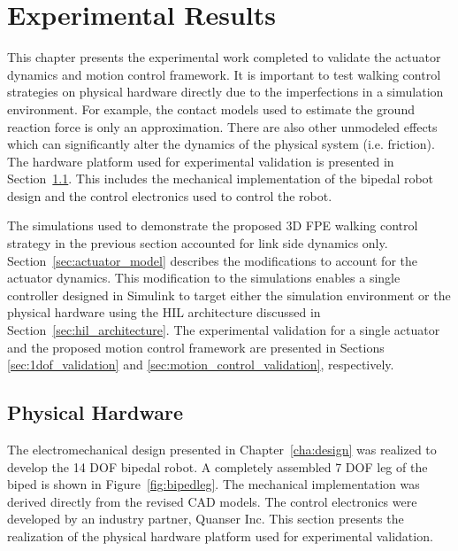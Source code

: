 \chapter{Experimental Results} %
\label{cha:experiments}

This chapter presents the experimental work completed to validate the actuator dynamics and motion control framework. It is important to test walking control strategies on physical hardware directly due to the imperfections in a simulation environment. For example, the contact models used to estimate the ground reaction force is only an approximation. There are also other unmodeled effects which can significantly alter the dynamics of the physical system (i.e. friction). The hardware platform used for experimental validation is presented in Section~\ref{sec:physical_hardware}. This includes the mechanical implementation of the bipedal robot design and the control electronics used to control the robot. 

The simulations used to demonstrate the proposed 3D FPE walking control strategy in the previous section accounted for link side dynamics only. Section~\ref{sec:actuator_model} describes the modifications to account for the actuator dynamics. This modification to the simulations enables a single controller designed in Simulink to target either the simulation environment or the physical hardware using the HIL architecture discussed in Section~\ref{sec:hil_architecture}. The experimental validation for a single actuator and the proposed motion control framework are presented in Sections \ref{sec:1dof_validation} and \ref{sec:motion_control_validation}, respectively. 

\section{Physical Hardware} %
\label{sec:physical_hardware}
The electromechanical design presented in Chapter~\ref{cha:design} was realized to develop the 14 DOF bipedal robot. A completely assembled 7 DOF leg of the biped is shown in Figure~\ref{fig:bipedleg}. The mechanical implementation was derived directly from the revised CAD models. The control electronics were developed by an industry partner, Quanser Inc. This section presents the realization of the physical hardware platform used for experimental validation. 


